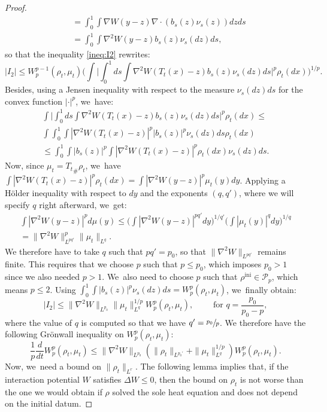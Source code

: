 \documentclass[11pt]{article}
\numberwithin{equation}{section}
\newcommand{\ini}{\mathrm{ini}}
\def\calP{{\mathcal P}}
\theoremstyle{plain}
\theoremstyle{definition}
\begin{document}
\begin{proof}
\begin{align*}
& = \int_0^1 \int \nabla W(y-z) \nabla \cdot (b_s(z) \nu_s(z)) dz ds \\
& = \int_0^1 \int \nabla^2 W(y-z) b_s(z) \nu_s(dz) ds,
\end{align*}
so that the inequality \eqref{ineq:I2} rewrites:
\[
|I_2| \leq W_p^{p-1}(\rho_t, \mu_t) \bigg( \int \bigg| \int_0^1 ds \int \nabla^2 W(T_t(x) - z) b_s(z) \nu_s(dz) ds \bigg|^p \rho_t(dx)\bigg)^{1/p}.
\]
Besides, using a Jensen inequality with respect to the measure $\nu_s(dz) ds$ for the convex function $|\cdot|^p$, we~have:
\begin{multline*}
\int \bigg| \int_0^1 ds \int \nabla^2 W(T_t(x) - z) b_s(z) \nu_s(dz) ds \bigg|^p \rho_t(dx) \leq \\
\int \int_0^1 \int |\nabla^2 W(T_t(x) - z)|^p |b_s(z)|^p \nu_s(dz) ds \rho_t(dx) \\
\leq \int_0^1 \int |b_s(z)|^p \int |\nabla^2 W(T_t(x) - z)|^p \rho_t(dx) \nu_s(dz) ds.
\end{multline*}
Now, since $\mu_t = {T_t}_\# \rho_t$, we~have $\int |\nabla^2 W(T_t(x) - z)|^p \rho_t(dx) = \int |\nabla^2 W(y - z)|^p \mu_t(y) dy$. Applying a Hölder inequality with respect to $dy$ and the exponents $(q,q')$, where we will specify $q$ right afterward, we~get:
\begin{multline*}
\int |\nabla^2 W(y - z)|^p d\mu(y) \leq \bigg( \int |\nabla^2 W(y - z)|^{pq'} dy \bigg)^{1/q'} \bigg( \int |\mu_t(y)|^{q} dy \bigg)^{1/q} \\
= \|\nabla^2 W\|_{L^{pq'}}^p \|\mu_t\|_{L^q}.
\end{multline*}
We therefore have to take $q$ such that $pq' = p_0$, so that $\|\nabla^2 W\|_{L^{pq'}}$ remains finite. This requires that we choose $p$ such that $p \leq p_0$, which imposes $p_0 > 1$ since we also needed $p>1$. We~also need to choose $p$ such that $\rho^{\ini}\in\calP_p$, which means $p\leq 2$. Using $\int_0^1 \int |b_s(z)|^p \nu_s(dz) ds = W_p^p(\rho_t, \mu_t)$, we~finally obtain:
\[
|I_2| \leq \|\nabla^2 W\|_{L^{p_0}} \|\mu_t\|_{L^q}^{1/p} W_p^p(\rho_t, \mu_t),\qquad\mbox{ for } q=\frac{p_0}{p_0-p},
\]
where the value of $q$ is computed so that we have $q'=\sfrac{p_0}{p}$.
We therefore have the following Grönwall inequality on $W_p^p(\rho_t, \mu_t)$:
\begin{equation}\label{ineq:GWp}
\frac 1p \frac{d}{dt} W_p^p(\rho_t, \mu_t) \leq \|\nabla^2 W\|_{L^{p_0}} \left( \|\rho_t\|_{L^{p_0'}} + \|\mu_t\|_{L^q}^{1/p} \right) W_p^p(\rho_t, \mu_t).
\end{equation}
Now, we~need a bound on $\|\rho_t\|_{L^r}$. The following lemma implies that, if the interaction potential $W$ satisfies $\Delta W \leq 0$, then the bound on $\rho_t$ is not worse than the one we would obtain if $\rho$ solved the sole heat equation and does not depend on the initial datum.

\end{proof}
\end{document}
